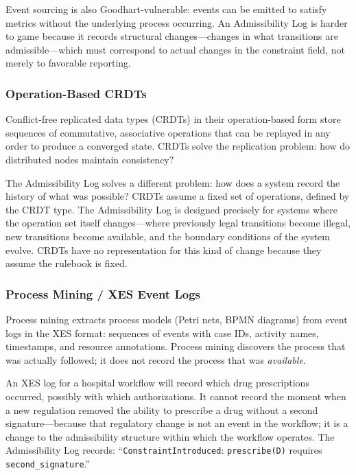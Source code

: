 \documentclass[12pt, a4paper]{article}
\theoremstyle{plain}
\theoremstyle{definition}
\theoremstyle{remark}
\begin{document}
Event sourcing is also Goodhart-vulnerable: events can be emitted to satisfy
metrics without the underlying process occurring. An Admissibility Log is
harder to game because it records structural changes---changes in what
transitions are admissible---which must correspond to actual changes in the
constraint field, not merely to favorable reporting.

\subsubsection{Operation-Based CRDTs}

Conflict-free replicated data types (CRDTs) in their operation-based form
store sequences of commutative, associative operations that can be replayed
in any order to produce a converged state. CRDTs solve the replication
problem: how do distributed nodes maintain consistency?

The Admissibility Log solves a different problem: how does a system record
the history of what was possible? CRDTs assume a fixed set of operations,
defined by the CRDT type. The Admissibility Log is designed precisely for
systems where the operation set itself changes---where previously legal
transitions become illegal, new transitions become available, and the
boundary conditions of the system evolve. CRDTs have no representation for
this kind of change because they assume the rulebook is fixed.

\subsubsection{Process Mining / XES Event Logs}

Process mining extracts process models (Petri nets, BPMN diagrams) from
event logs in the XES format: sequences of events with case IDs, activity
names, timestamps, and resource annotations. Process mining discovers the
process that was actually followed; it does not record the process that was
\emph{available}.

An XES log for a hospital workflow will record which drug prescriptions
occurred, possibly with which authorizations. It cannot record the moment
when a new regulation removed the ability to prescribe a drug without a
second signature---because that regulatory change is not an event in the
workflow; it is a change to the admissibility structure within which the
workflow operates. The Admissibility Log records: ``\texttt{ConstraintIntroduced}:
\texttt{prescribe(D)} requires \texttt{second\_signature}.''
\end{document}
